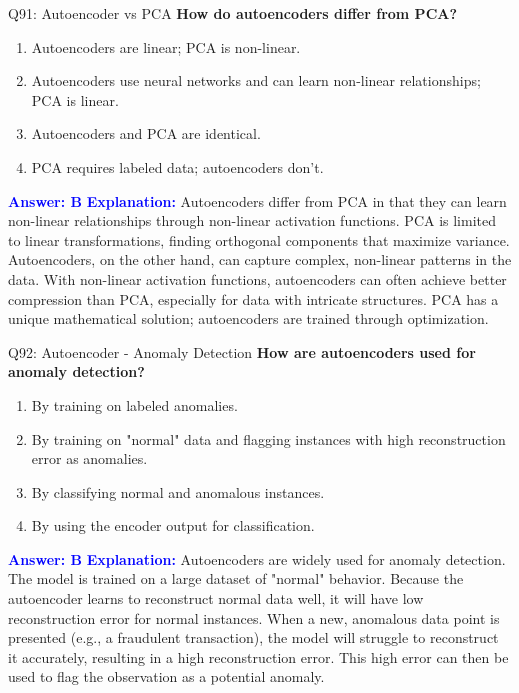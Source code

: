 \documentclass[8pt]{beamer}
\begin{document}
	\begin{frame}{Q91: Autoencoder vs PCA}
		\fontsize{6.5}{7.5}\selectfont
		\textbf{How do autoencoders differ from PCA?}
		\begin{enumerate}
			\item Autoencoders are linear; PCA is non-linear.
			\item Autoencoders use neural networks and can learn non-linear relationships; PCA is linear.
			\item Autoencoders and PCA are identical.
			\item PCA requires labeled data; autoencoders don't.
		\end{enumerate}
		\vspace{0.1cm}
		\textcolor{blue}{\textbf{Answer: B}}
		\vspace{0.1cm}
		\textcolor{blue}{\textbf{Explanation:}} Autoencoders differ from PCA in that they can learn non-linear relationships through non-linear activation functions. PCA is limited to linear transformations, finding orthogonal components that maximize variance. Autoencoders, on the other hand, can capture complex, non-linear patterns in the data. With non-linear activation functions, autoencoders can often achieve better compression than PCA, especially for data with intricate structures. PCA has a unique mathematical solution; autoencoders are trained through optimization.
	\end{frame}
	
	\begin{frame}{Q92: Autoencoder - Anomaly Detection}
		\fontsize{6.5}{7.5}\selectfont
		\textbf{How are autoencoders used for anomaly detection?}
		\begin{enumerate}
			\item By training on labeled anomalies.
			\item By training on "normal" data and flagging instances with high reconstruction error as anomalies.
			\item By classifying normal and anomalous instances.
			\item By using the encoder output for classification.
		\end{enumerate}
		\vspace{0.1cm}
		\textcolor{blue}{\textbf{Answer: B}}
		\vspace{0.1cm}
		\textcolor{blue}{\textbf{Explanation:}} Autoencoders are widely used for anomaly detection. The model is trained on a large dataset of "normal" behavior. Because the autoencoder learns to reconstruct normal data well, it will have low reconstruction error for normal instances. When a new, anomalous data point is presented (e.g., a fraudulent transaction), the model will struggle to reconstruct it accurately, resulting in a high reconstruction error. This high error can then be used to flag the observation as a potential anomaly.
	\end{frame}
	
\end{document}
